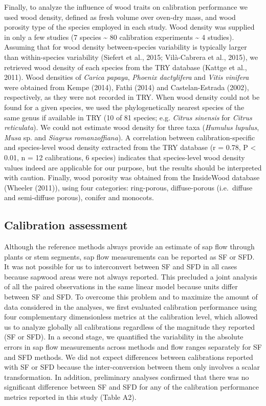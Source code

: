 \documentclass[11pt,twoside]{reedthesis}
\begin{document}
Finally, to analyze the influence of wood traits on calibration
performance we used wood density, defined as fresh volume over oven-dry
mass, and wood porosity type of the species employed in each study. Wood
density was supplied in only a few studies (7 species \textasciitilde{}
80 calibration experiments \textasciitilde{} 4 studies). Assuming that
for wood density between-species variability is typically larger than
within-species variability (Siefert et al., 2015; Vilà-Cabrera et al.,
2015), we retrieved wood density of each species from the TRY database
(Kattge et al., 2011). Wood densities of \emph{Carica papaya},
\emph{Phoenix dactylifera} and \emph{Vitis vinifera} were obtained from
Kempe (2014), Fathi (2014) and Castelan-Estrada (2002), respectively, as
they were not recorded in TRY. When wood density could not be found for
a given species, we used the phylogenetically nearest species of the
same genus if available in TRY (10 of 81 species; e.g. \emph{Citrus
sinensis} for \emph{Citrus reticulata}). We could not estimate wood
density for three taxa (\emph{Humulus lupulus}, \emph{Musa} sp. and
\emph{Siagrus romanzoffiana}). A correlation between
calibration-specific and species-level wood density extracted from the
TRY database (r = 0.78, P \textless{} 0.01, n = 12 calibrations, 6
species) indicates that species-level wood density values indeed are
applicable for our purpose, but the results should be interpreted with
caution. Finally, wood porosity was obtained from the InsideWood
database (Wheeler (2011)), using four categories: ring-porous,
diffuse-porous (i.e.~diffuse and semi-diffuse porous), conifer and
monocots.\par

\subsection{Calibration assessment}\label{calibration-assessment}

Although the reference methods always provide an estimate of sap flow
through plants or stem segments, sap flow measurements can be reported
as SF or SFD. It was not possible for us to interconvert between SF and
SFD in all cases because sapwood areas were not always reported. This
precluded a joint analysis of all the paired observations in the same
linear model because units differ between SF and SFD. To overcome this
problem and to maximize the amount of data considered in the analyses,
we first evaluated calibration performance using four complementary
dimensionless metrics at the calibration level, which allowed us to
analyze globally all calibrations regardless of the magnitude they
reported (SF or SFD). In a second stage, we quantified the variability
in the absolute errors in sap flow measurements across methods and flow
ranges separately for SF and SFD methods. We did not expect differences
between calibrations reported with SF or SFD because the
inter-conversion between them only involves a scalar transformation. In
addition, preliminary analyses confirmed that there was no significant
difference between SF and SFD for any of the calibration performance
metrics reported in this study (Table A2).\par
\end{document}
